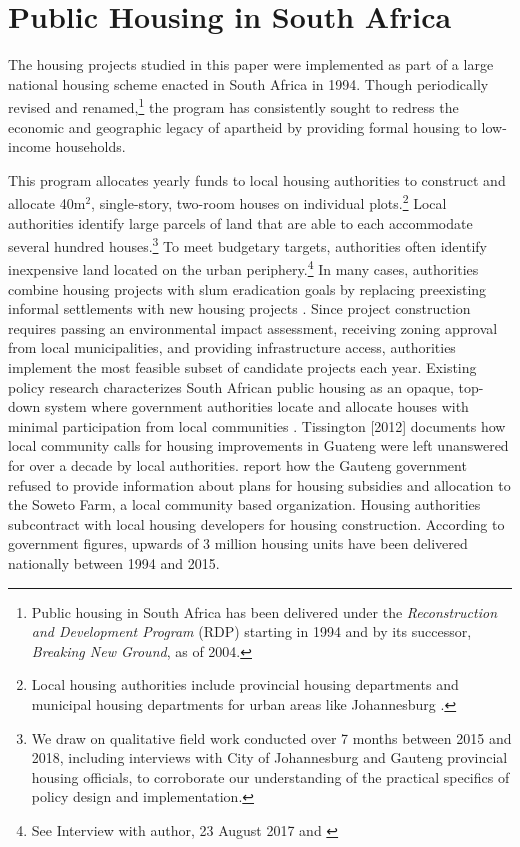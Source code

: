 \documentclass[12pt]{article}
\begin{document}
\section{Public Housing in South Africa}\label{section:background}


The housing projects studied in this paper were implemented as part of a large national housing scheme enacted in South Africa in 1994. Though periodically revised and renamed,\footnote{Public housing in South Africa has been delivered under the {\it Reconstruction and Development Program} (RDP) starting in 1994 and  by its successor, {\it Breaking New Ground}, as of 2004.} the program has consistently sought to redress the economic and geographic legacy of apartheid by providing formal housing to low-income households.  

This program allocates yearly funds to local housing authorities to construct and allocate 40m$^2$, single-story, two-room houses on individual plots.\footnote{Local housing authorities include provincial housing departments and municipal housing departments for urban areas like Johannesburg \citep{dhsreports}.}  Local authorities identify large parcels of land that are able to each accommodate several hundred houses.\footnote{We draw on qualitative field work conducted over 7 months between 2015 and 2018, including interviews with City of Johannesburg and Gauteng provincial housing officials, to corroborate our understanding of the practical specifics of policy design and implementation.}  To meet budgetary targets, authorities often identify inexpensive land located on the urban periphery.\footnote{See Interview with author, 23 August 2017 and \cite{dhsreports}}  In many cases, authorities combine housing projects with slum eradication goals by replacing preexisting informal settlements with new housing projects \citep{hofmeyr2008risk}.  Since project construction requires passing an environmental impact assessment, receiving zoning approval from local municipalities, and providing infrastructure access, authorities implement the most feasible subset of candidate projects each year.  Existing policy research characterizes South African public housing as an opaque, top-down system where government authorities locate and allocate houses with minimal participation from local communities \citep{seriq}.  Tissington [2012] documents how local community calls for housing improvements in Guateng were left unanswered for over a decade by local authorities.  \cite{seriq} report how the Gauteng government refused to provide information about plans for housing subsidies and allocation to the Soweto Farm, a local community based organization.   Housing authorities subcontract with local housing developers for housing construction.  According to government figures, upwards of 3 million housing units have been delivered nationally between 1994 and 2015.
\end{document}
